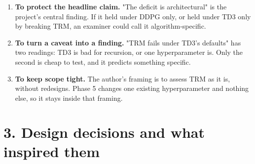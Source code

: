 \documentclass[11pt]{article}
\begin{document}
\begin{enumerate}
\item \textbf{To protect the headline claim.} "The deficit is architectural" is the project's central finding. If it held under DDPG only, or held under TD3 only by breaking TRM, an examiner could call it algorithm-specific.
\item \textbf{To turn a caveat into a finding.} "TRM fails under TD3's defaults" has two readings: TD3 is bad for recursion, or one hyperparameter is. Only the second is cheap to test, and it predicts something specific.
\item \textbf{To keep scope tight.} The author's framing is to assess TRM as it is, without redesigns. Phase 5 changes one existing hyperparameter and nothing else, so it stays inside that framing.
\end{enumerate}



\section*{3. Design decisions and what inspired them}
\end{document}
